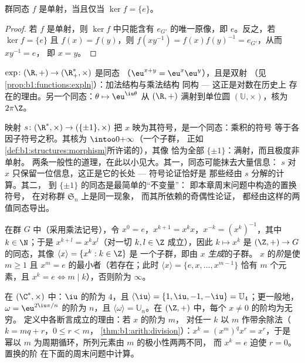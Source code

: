 \begin{proposition}[借助核判定单射性]\label{prop:b1:structures:kernel}
群同态 $f$ 是单射，当且仅当 $\ker f =
\{e\}$。
\end{proposition}

\begin{proof}
若 $f$ 是单射，则 $\ker f$ 中只能含有
$e_{G'}$ 的唯一原像，即 $e$。反之，若 $\ker f = \{e\}$ 且 $f(x) =
f(y)$，则 $f(xy^{-1}) = f(x) f(y)^{-1} = e_{G'}$，从而 $xy^{-1} = e$，
即 $x = y$。
\end{proof}

\begin{example}\label{ex:b1:structures:expmorphism}
$\exp \colon (\R, +) \to (\R_+^*, \times)$ 是同态
（$\eu^{x+y} = \eu^x \eu^y$），且是双射
（见\cref{prop:b1:functions:expln}）：加法结构与乘法结构
同构 --- 这正是对数在历史上
存在的理由。另一个同态：$\theta \mapsto \eu^{\iu\theta}$ 从
$(\R, +)$ 满射到单位圆 $(\mathbb{U}, \times)$，核为
$2\pi\Z$。
\end{example}

\begin{example}[符号同态]\label{ex:b1:structures:signmorphism}
映射 $s \colon (\R^*, \times) \to (\{\pm1\}, \times)$ 把
$x$ 映为其符号，是一个同态：乘积的符号
等于各因子符号之积。其核为 $\intoo0{+\infty}$（一个子群，
正如\cref{def:b1:structures:morphism}所许诺的），其像
恰为全部 $\{\pm1\}$：满射，而且极度非单射。
两条一般性的道理，在此以小见大。其一，同态可能抹去大量信息：
$s$ 对 $x$ 只保留一位信息，这正是它的长处 --- 符号论证恰好是
那些经由 $s$ 分解的计算。其二，
到 $\{\pm1\}$ 的同态是最简单的“不变量”：
即本章周末问题中构造的置换符号，
在对称群 $\mathfrak S_n$ 上是同一现象，
而其所依赖的奇偶性论证，
都经由这样的两值同态导出。
\end{example}

\begin{definition}[幂，元素的阶]\label{def:b1:structures:order}
在群 $G$ 中（采用乘法记号），令 $x^0 = e$，$x^{k+1} =
x^k x$，$x^{-k} = (x^k)^{-1}$，其中 $k \in \N$；于是 $x^{k+l} = x^k
x^l$（对一切 $k, l \in \Z$ 成立），因此 $k \mapsto x^k$ 是 $(\Z,
+) \to G$ 的同态，其像 $\langle x \rangle = \{x^k : k \in \Z\}$ 是
一个子群，即由 $x$ \emph{生成}的子群。
$x$ 的\emph{阶}是使 $m \geq
1$ 且 $x^m = e$ 的最小者（若存在；此时 $\langle x\rangle = \{e, x,
\dots, x^{m-1}\}$ 恰有 $m$ 个元素，且 $x^k = e \iff m
\mid k$），否则阶为 $\infty$。
\end{definition}

\begin{example}\label{ex:b1:structures:order}
在 $(\C^*, \times)$ 中：$\iu$ 的阶为 $4$，且 $\langle \iu \rangle
= \{1, \iu, -1, -\iu\} = \mathbb{U}_4$；更一般地，$\omega =
\eu^{2\iu\pi/n}$ 的阶为 $n$，且 $\langle\omega\rangle =
\mathbb{U}_n$。在 $(\Z, +)$ 中，每个 $x \neq 0$ 的阶均为无穷。
定义中各断言成立的理由：若 $x$ 的阶为 $m$，
对任一 $k$ 以 $m$ 作带余除法（$k = mq + r$，$0 \leq r < m$，
\cref{thm:b1:arith:division}）：$x^k = (x^m)^q x^r = x^r$，于是
幂以 $m$ 为周期循环，所列元素由 $m$ 的极小性两两不同，
而 $x^k = e$ 迫使 $r = 0$。置换的阶
在下面的周末问题中计算。
\end{example}

